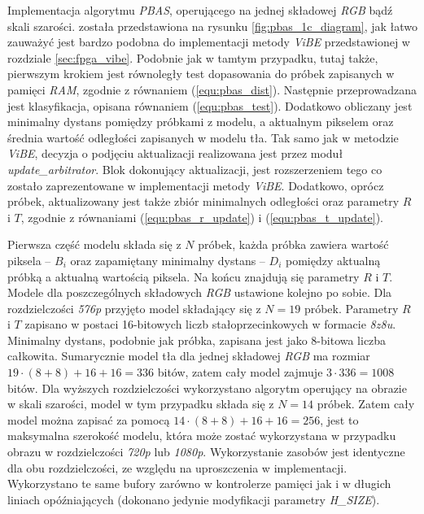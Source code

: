 Implementacja algorytmu \textit{PBAS}, operującego na jednej składowej \textit{RGB} bądź skali szarości. została przedstawiona na rysunku \ref{fig:pbas_1c_diagram}, jak łatwo zauważyć jest bardzo podobna do implementacji metody \textit{ViBE} przedstawionej w rozdziale \ref{sec:fpga_vibe}. 
Podobnie jak w tamtym przypadku, tutaj także, pierwszym krokiem jest równoległy test dopasowania do próbek zapisanych w pamięci \textit{RAM}, zgodnie z równaniem (\ref{equ:pbas_dist}). 
Następnie przeprowadzana jest klasyfikacja, opisana równaniem (\ref{equ:pbas_test}). 
Dodatkowo obliczany jest minimalny dystans pomiędzy próbkami z modelu, a aktualnym pikselem oraz średnia wartość odległości zapisanych w modelu tła.
Tak samo jak w metodzie \textit{ViBE}, decyzja o podjęciu aktualizacji realizowana jest przez moduł \textit{update\_arbitrator}. 
Blok dokonujący aktualizacji, jest rozszerzeniem tego co zostało zaprezentowane w implementacji metody \textit{ViBE}. 
Dodatkowo, oprócz próbek, aktualizowany jest także zbiór minimalnych odległości oraz parametry $R$ i $T$, zgodnie z równaniami (\ref{equ:pbas_r_update}) i (\ref{equ:pbas_t_update}).

Pierwsza część modelu składa się z $N$ próbek, każda próbka zawiera wartość piksela -- $B_i$ oraz zapamiętany minimalny dystans -- $D_i$ pomiędzy aktualną próbką a aktualną wartością piksela. 
Na końcu znajdują się parametry $R$ i $T$. 
Modele dla poszczególnych składowych \textit{RGB} ustawione kolejno po sobie. 
Dla rozdzielczości \textit{576p} przyjęto model składający się z $N=19$ próbek. 
Parametry $R$ i $T$ zapisano w postaci 16-bitowych liczb stałoprzecinkowych w formacie \textit{8z8u}. 
Minimalny dystans, podobnie jak próbka, zapisana jest jako 8-bitowa liczba całkowita. 
Sumarycznie model tła dla jednej składowej \textit{RGB} ma rozmiar $19 \cdot (8+8) + 16 + 16 = 336$ bitów, zatem cały model zajmuje $3 \cdot 336 = 1008$ bitów. 
Dla wyższych rozdzielczości wykorzystano algorytm operujący na obrazie w skali szarości, model w tym przypadku składa się z $N=14$ próbek. 
Zatem cały model można zapisać za pomocą $14 \cdot (8+8) + 16 + 16 = 256$, jest to maksymalna szerokość modelu, która może zostać wykorzystana w przypadku obrazu w rozdzielczości \textit{720p} lub \textit{1080p}. Wykorzystanie zasobów jest identyczne dla obu rozdzielczości, ze względu na uproszczenia w implementacji. Wykorzystano te same bufory zarówno w kontrolerze pamięci jak i w długich liniach opóźniających (dokonano jedynie modyfikacji parametry \textit{H\_SIZE}).

